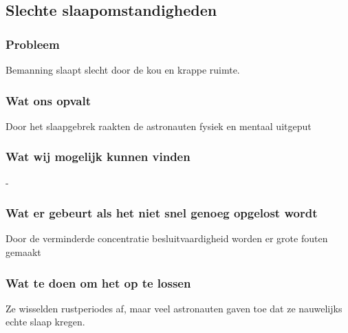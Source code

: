 \subsection{Slechte slaapomstandigheden}

\subsubsection{Probleem}
Bemanning slaapt slecht door de kou en krappe ruimte.

\subsubsection{Wat ons opvalt}
Door het slaapgebrek raakten de astronauten fysiek en mentaal uitgeput

\subsubsection{Wat wij mogelijk kunnen vinden}
-

\subsubsection{Wat er gebeurt als het niet snel genoeg opgelost wordt}
Door de verminderde concentratie besluitvaardigheid worden er grote fouten gemaakt

\subsubsection{Wat te doen om het op te lossen}
Ze wisselden rustperiodes af, maar veel astronauten gaven toe dat ze nauwelijks echte slaap kregen.